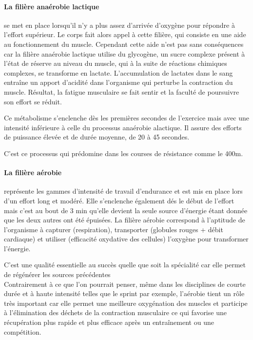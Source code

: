         
        \paragraph{La filière anaérobie lactique}
        se met en place lorsqu'il n’y a plus assez d’arrivée d’oxygène pour répondre à l’effort supérieur. Le corps fait alors appel à cette filière, qui consiste en une aide au fonctionnement du muscle. Cependant cette aide n’est pas sans conséquences car la filière anaérobie lactique utilise du glycogène, un sucre complexe présent à l'état de réserve au niveau du muscle, qui à la suite de réactions chimiques complexes, se transforme en lactate. L'accumulation de lactates dans le sang entraîne un apport d’acidité dans l’organisme qui perturbe la contraction du muscle.
        Résultat, la fatigue musculaire se fait sentir et la faculté de poursuivre son effort se réduit. 
        
        Ce métabolisme s’enclenche dès les premières secondes de l’exercice mais avec une intensité inférieure à celle du processus anaérobie alactique.
        Il assure des efforts de puissance élevée et de durée moyenne, de 20 à 45 secondes. 
        
        C'est ce processus qui prédomine dans les courses de résistance comme le 400m. 
        
        
        \paragraph{La filière aérobie}
        représente les gammes d’intensité de travail d’endurance et est mis en place lors d'un effort long et modéré.
        Elle s'enclenche également dés le début de l'effort mais c'est au bout de 3 min qu'elle devient la seule source d'énergie étant donnée que les deux autres ont été épuisées.
        La filière aérobie correspond à l’aptitude de l’organisme à capturer (respiration), transporter (globules rouges + débit cardiaque) et utiliser (efficacité oxydative des cellules) l’oxygène pour transformer l’énergie.
         
        C'est une qualité essentielle au succès quelle que soit la spécialité car elle permet de régénérer les sources précédentes\\
         
        Contrairement à ce que l'on pourrait penser, même dans les disciplines de courte durée et à haute intensité telles que le sprint par exemple, l'aérobie tient un rôle très important car elle permet une meilleure oxygénation des muscles et participe à l’élimination des déchets de la contraction musculaire ce qui favorise une récupération plus rapide et plus efficace après un entraînement ou une compétition. \\
        
